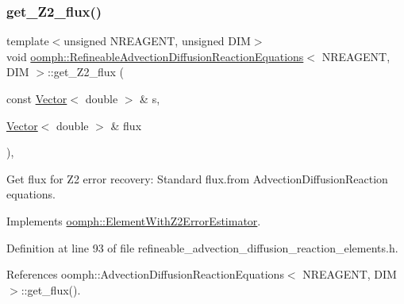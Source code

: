 \subsubsection{\texorpdfstring{get\+\_\+\+Z2\+\_\+flux()}{get\_Z2\_flux()}}
{\footnotesize\ttfamily template$<$unsigned N\+R\+E\+A\+G\+E\+NT, unsigned D\+IM$>$ \\
void \hyperlink{classoomph_1_1RefineableAdvectionDiffusionReactionEquations}{oomph\+::\+Refineable\+Advection\+Diffusion\+Reaction\+Equations}$<$ N\+R\+E\+A\+G\+E\+NT, D\+IM $>$\+::get\+\_\+\+Z2\+\_\+flux (\begin{DoxyParamCaption}\item[{const \hyperlink{classoomph_1_1Vector}{Vector}$<$ double $>$ \&}]{s,  }\item[{\hyperlink{classoomph_1_1Vector}{Vector}$<$ double $>$ \&}]{flux }\end{DoxyParamCaption})\hspace{0.3cm}{\ttfamily [inline]}, {\ttfamily [virtual]}}



Get \textquotesingle{}flux\textquotesingle{} for Z2 error recovery\+: Standard flux.\+from Advection\+Diffusion\+Reaction equations. 



Implements \hyperlink{classoomph_1_1ElementWithZ2ErrorEstimator_a5688ff5f546d81771cabad82ca5a7556}{oomph\+::\+Element\+With\+Z2\+Error\+Estimator}.



Definition at line 93 of file refineable\+\_\+advection\+\_\+diffusion\+\_\+reaction\+\_\+elements.\+h.



References oomph\+::\+Advection\+Diffusion\+Reaction\+Equations$<$ N\+R\+E\+A\+G\+E\+N\+T, D\+I\+M $>$\+::get\+\_\+flux().

\mbox{\label{classoomph_1_1RefineableAdvectionDiffusionReactionEquations_a3d19d1247a3ba838a67263b75d6341a0}} 
